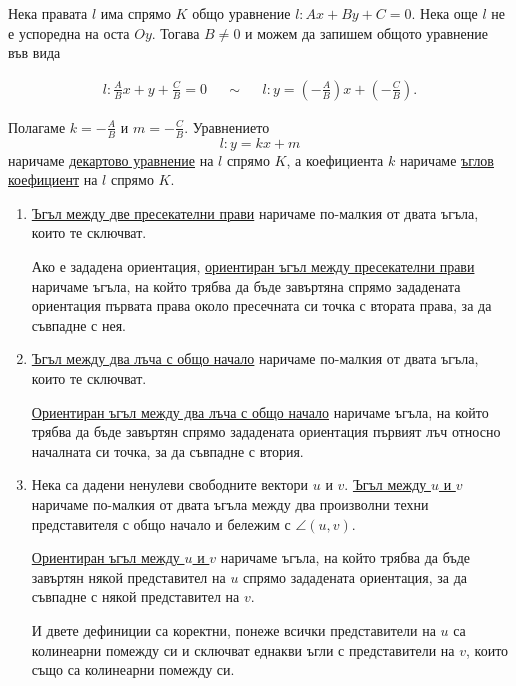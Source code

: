 \documentclass[numbers=endperiod, DIV=15, bibliography=totocnumbered]{scrartcl}
\begin{document}
\begin{definition}
  Нека правата $l$ има спрямо $K$ общо уравнение $l: Ax + By + C = 0$. Нека още $l$ не е успоредна на оста $Oy$. Тогава $B \neq 0$ и можем да запишем общото уравнение във вида

  \begin{align*}
    l: \frac A B x + y + \frac C B = 0
    &&\sim&&
    l: y = \left(-\frac A B \right) x + \left(-\frac C B \right).
  \end{align*}

  Полагаме $k = -\frac A B$ и $m = -\frac C B$. Уравнението
  \begin{displaymath}
    l: y = kx + m
  \end{displaymath}
  наричаме \uline{декартово уравнение} на $l$ спрямо $K$, а коефициента $k$ наричаме \uline{ъглов коефициент} на $l$ спрямо $K$.
\end{definition}

\begin{definition}
  \mbox{}
  \begin{enumerate}
    \item \uline{Ъгъл между две пресекателни прави} наричаме по-малкия от двата ъгъла, които те сключват.

    Ако е зададена ориентация, \uline{ориентиран ъгъл между пресекателни прави} наричаме ъгъла, на който трябва да бъде завъртяна спрямо зададената ориентация първата права около пресечната си точка с втората права, за да съвпадне с нея.

    \item \uline{Ъгъл между два лъча с общо начало} наричаме по-малкия от двата ъгъла, които те сключват.

    \uline{Ориентиран ъгъл между два лъча с общо начало} наричаме ъгъла, на който трябва да бъде завъртян спрямо зададената ориентация първият лъч относно началната си точка, за да съвпадне с втория.

    \item Нека са дадени ненулеви свободните вектори $u$ и $v$. \uline{Ъгъл между $u$ и $v$} наричаме по-малкия от двата ъгъла между два произволни техни представителя с общо начало и бележим с $\angle(u, v)$.

    \uline{Ориентиран ъгъл между $u$ и $v$} наричаме ъгъла, на който трябва да бъде завъртян някой представител на $u$ спрямо зададената ориентация, за да съвпадне с някой представител на $v$.

    И двете дефиниции са коректни, понеже всички представители на $u$ са колинеарни помежду си и сключват еднакви ъгли с представители на $v$, които също са колинеарни помежду си.
  \end{enumerate}
\end{definition}
\end{document}
